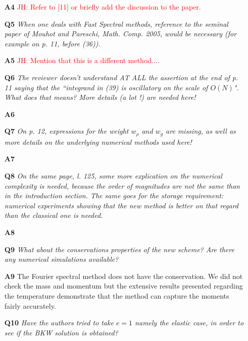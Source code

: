 \documentclass[11pt]{article}
\newcommand{\jh}[1]{\textcolor{red}{JH: #1}}
\begin{document}
\begin{itemize}
\item[{\bf A4}] \jh{Refer to [11] or briefly add the discussion to the paper.}

\item[{\bf Q5}] {\it When one deals with Fast Spectral methods, reference to the seminal paper of Mouhot and Pareschi, Math. Comp. 2005, would be necessary (for example on p. 11, before (36)).}

\item[{\bf A5}] \jh{Mention that this is a different method....}


\item[{\bf Q6}] {\it The reviewer doesn't understand AT ALL the assertion at the end of p. 11 saying that the ``integrand in (39) is oscillatory on the scale of $O(N)$". What does that means? More details (a lot !) are needed here!}

\item[{\bf A6}] 

\item[{\bf Q7}] {\it On p. 12, expressions for the weight $w_{\rho}$ and $w_g$ are missing, as well as more details on the underlying numerical methods used here!}

\item[{\bf A7}] 

\item[{\bf Q8}] {\it On the same page, l. 125, some more explication on the numerical complexity is needed, because the order of magnitudes are not the same than in the introduction section. The same goes for the storage requirement: numerical experiments showing that the new method is better on that regard than the classical one is needed.
}

\item[{\bf A8}] 

\item[{\bf Q9}] {\it What about the conservations properties of the new scheme? Are there any numerical simulations available?
}

\item[{\bf A9}] The Fourier spectral method does not have the conservation. We did not check the mass and momentum but the extensive results presented regarding the temperature demonstrate that the method can capture the moments fairly accurately. 


\item[{\bf Q10}] {\it Have the authors tried to take $e=1$ namely the elastic case, in order to see if the BKW solution is obtained?
}


\end{itemize}
\end{document}
